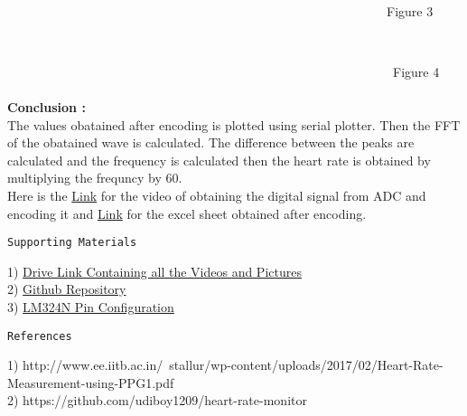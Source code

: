 \documentclass{homework}
\begin{document}
 \\
  \\
   \\
    \\
    \\
    \\
\indent \ \ \ \ \ \ \ \ \ \ \ \ \ \ \ \ \ \ \  \ \ \ \ \ \ \ \ \ \ \ \ \ \ \ \ \ \   \ \ \ \  \ \ \ \ \ \ \  \ \ \ \ \ \ \ \ \ \ \ \ Figure 3\\
\begin{center}
    \\
\end{center}
\indent \ \ \ \ \ \ \ \  \ \ \ \ \  \ \  \ \ \ \ \ \ \ \ \ \ \ \  \ \ \ \ \ \ \ \ \ \ \ \ \ \ \ \ \ \ \ \ \ \  \ \ \ \ \ \ \ \ \ \ \ \ Figure 4 \\
 \\
\textbf{Conclusion :}\\
The values obatained after encoding is plotted using serial plotter. Then the FFT of the obatained wave is calculated. The difference between the peaks are calculated and the frequency is calculated then the heart rate is obtained by multiplying the frequncy by 60.\\
Here is the \href{https://drive.google.com/file/d/1NPStH7hU0MxG5iE_yXVHSs0OpeId46x4/view?usp=share_link}{Link} for the video of obtaining the digital signal from ADC and encoding it and \href{https://1drv.ms/x/s!AuQYwSGEkrzP3CZkBo6J1Lu3KujK?e=yTcLPL}{Link} for the excel sheet obtained after encoding.
\begin{center}
    \texttt{Supporting Materials}
\end{center}
1) \href{https://drive.google.com/drive/folders/1NKXPOUdBulDcIGyHvjaXw_hG5qdx01pC?usp=sharing}{Drive Link Containing all the Videos and Pictures}\\
2) \href{https://github.com/TEJADHITH/bpm_bp_measurement}{Github Repository}\\
3) \href{https://microcontrollerslab.com/lm324-op-amp-pinout-datasheet-applications-features-datasheet/}{LM324N Pin Configuration}
\begin{center}
    \texttt{References}
\end{center}
1) http://www.ee.iitb.ac.in/~stallur/wp-content/uploads/2017/02/Heart-Rate-Measurement-using-PPG1.pdf\\
2) https://github.com/udiboy1209/heart-rate-monitor
\end{document}
